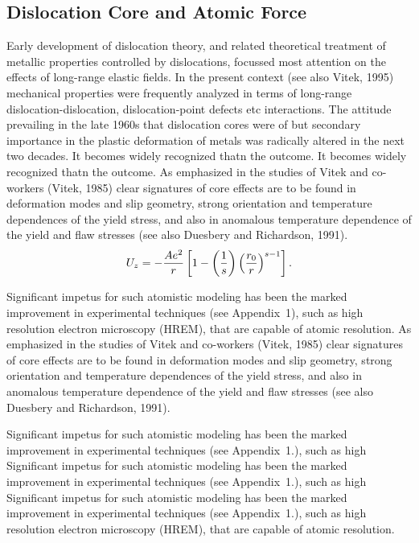 
\begin{appendix}

\chapter{Dislocation Core and Atomic Force} %
 
Early development of dislocation theory, and related theoretical
treatment of metallic properties controlled by dislocations, focussed
most attention on the effects of long-range elastic fields. In the
present context (see also Vitek, 1995) mechanical properties were
frequently analyzed in terms of long-range dislocation-dislocation,
dislocation-point defects etc interactions. The attitude prevailing in
the late 1960s that dislocation cores were of but secondary importance
in the plastic deformation of metals was radically altered in the next
two decades. It becomes widely recognized thatn the outcome. It
becomes widely recognized thatn the outcome.  As emphasized in the
studies of Vitek and co-workers (Vitek, 1985) clear signatures of core
effects are to be found in deformation modes and slip geometry, strong
orientation and temperature dependences of the yield stress, and also
in anomalous temperature dependence of the yield and flaw stresses
(see also Duesbery and Richardson, 1991).
\begin{equation} 
U_z =-{Ae^2\over r}\left[{1-\left({1\over s}\right)
\left({r_0\over r}\right)^{s-1}}\right].
\end{equation}

Significant impetus for such atomistic modeling has been the marked
improvement in experimental techniques (see Appendix~1), such as high
resolution electron microscopy (HREM), that are capable of atomic
resolution. As emphasized in the studies of Vitek and co-workers
(Vitek, 1985) clear signatures of core effects are to be found in
deformation modes and slip geometry, strong orientation and
temperature dependences of the yield stress, and also in anomalous
temperature dependence of the yield and flaw stresses (see also
Duesbery and Richardson, 1991).

Significant impetus for such atomistic modeling has been the marked
improvement in experimental techniques (see Appendix~1.), such as high
Significant impetus for such atomistic modeling has been the marked
improvement in experimental techniques (see Appendix~1.), such as high
Significant impetus for such atomistic modeling has been the marked
improvement in experimental techniques (see Appendix~1.), such as high
resolution electron microscopy (HREM), that are capable of atomic
resolution.


\end{appendix}
